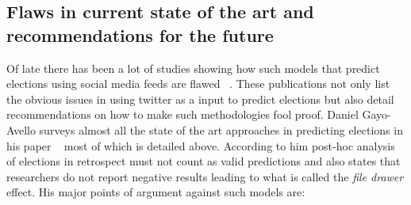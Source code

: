 \documentclass{article}
\begin{document}
\subsection{Flaws in current state of the art and recommendations for the future}
Of late there has been a lot of studies showing how such models that predict elections using
social media feeds are flawed ~\cite{metaxas2011not,gayo2012wanted,gayo2011don,gayo2011limits}. 
These publications not only list the obvious issues in using twitter as a input to predict
elections but also detail recommendations on how to make such methodologies fool proof. 
Daniel Gayo-Avello surveys almost all the state of the art approaches in predicting elections in 
his paper ~\cite{gayo2012wanted} most of which is detailed above. 
According to him post-hoc analysis of elections in retrospect must not count as valid predictions
and also states that researchers do not report negative results leading to what is called 
the \emph{file drawer} effect. His major points of argument against such models are:
\end{document}
